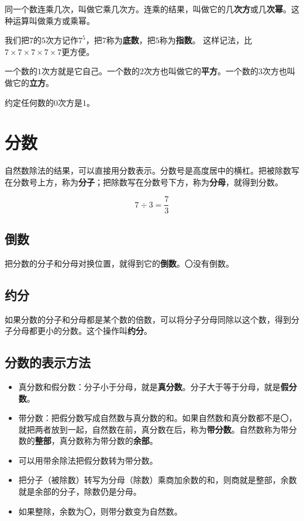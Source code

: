 \documentclass[12pt,UTF8]{ctexart}
\begin{document}
同一个数连乘几次，叫做它乘几次方。连乘的结果，叫做它的几\textbf{次方}或几\textbf{次幂}。这种运算叫做乘方或乘幂。

我们把\( 7 \)的\( 5 \)次方记作\( 7^5 \)，把\( 7 \)称为\textbf{底数}，把\( 5 \)称为\textbf{指数}。
这样记法，比\( 7\times 7\times 7\times 7\times 7 \)更方便。

一个数的\( 1 \)次方就是它自己。一个数的\( 2 \)次方也叫做它的\textbf{平方}。一个数的\( 3 \)次方也叫做它的\textbf{立方}。

约定任何数的\( 0 \)次方是\( 1 \)。

\section{分数}

自然数除法的结果，可以直接用分数表示。分数号是高度居中的横杠。把被除数写在分数号上方，称为\textbf{分子}；把除数写在分数号下方，称为\textbf{分母}，就得到分数。

\[ 7 \div 3 = \frac{7}{3}\]

\subsection{倒数}

把分数的分子和分母对换位置，就得到它的\textbf{倒数}。〇没有倒数。

\subsection{约分}

如果分数的分子和分母都是某个数的倍数，可以将分子分母同除以这个数，得到分子分母都更小的分数。这个操作叫\textbf{约分}。

\subsection{分数的表示方法}

\begin{itemize}
\item 真分数和假分数：分子小于分母，就是\textbf{真分数}。分子大于等于分母，就是\textbf{假分数}。
\item 带分数：把假分数写成自然数与真分数的和。如果自然数和真分数都不是〇，就把两者放到一起，自然数在前，真分数在后，称为\textbf{带分数}。自然数称为带分数的\textbf{整部}，真分数称为带分数的\textbf{余部}。
\item 可以用带余除法把假分数转为带分数。
\item 把分子（被除数）转写为分母（除数）乘商加余数的和，则商就是整部，余数就是余部的分子，除数仍是分母。
\item 如果整除，余数为〇，则带分数变为自然数。
\end{itemize}
\end{document}
